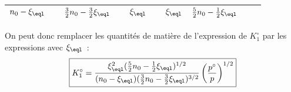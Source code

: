 \documentclass[../TDTM2.tex]{subfiles}%
\begin{document}
{\begin{center}
\begin{tabularx}{\linewidth}{|l|c||YdYdYdY||Y|}
		$n_0 - \xi_{\eql}$                       & \vline               &
		$\frac{3}{2}n_0 - \frac{3}{2}\xi_{\eql}$ & \vline               &
		$\xi_{\eql}$                             & \vline               &
		$\xi_{\eql}$                             &
		$\frac{5}{2}n_0 - \frac{1}{2}\xi_{\eql}$                          \\
		\hline
	\end{tabularx}
\end{center}
On peut donc remplacer les quantités de matière de l'expression de
$K_1^\circ$ par les expressions avec $\xi_{\eql}$~:
\[\boxed{
		K_1^\circ =
		\frac{\xi_{\eql}^2( \frac{5}{2}n_0- \frac{1}{2}\xi_{\eql})^{1/2}}
		{(n_0-\xi_{\eql})( \frac{3}{2}n_0 - \frac{3}{2}\xi_{\eql})^{3/2}}
		\left(\frac{p^\circ}{p}\right)^{1/2}}
\]
}

\end{document}
